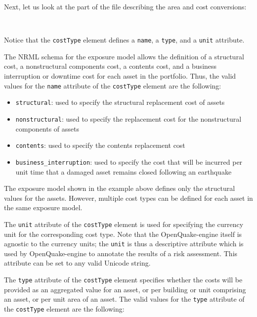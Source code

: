 Next, let us look at the part of the file describing the area and cost
conversions:

\inputminted[firstline=10,firstnumber=10,lastline=15,fontsize=\footnotesize,frame=single,linenos,bgcolor=lightgray]{xml}{oqum/risk/Verbatim/input_exposure_minimal.xml}\\

Notice that the \Verb+costType+ element defines a \Verb+name+, a \Verb+type+, 
and a \Verb+unit+ attribute.

The NRML schema for the exposure model allows the definition of a structural
cost, a nonstructural components cost, a contents cost, and a business
interruption or downtime cost for each asset in the portfolio. Thus, the valid
values for the \Verb+name+ attribute of the \Verb+costType+ element are the
following:

\begin{itemize}

    \item \Verb+structural+: used to specify the structural replacement cost
    of assets

    \item \Verb+nonstructural+: used to specify the replacement cost for the
    nonstructural components of assets

    \item \Verb+contents+: used to specify the contents replacement cost

    \item \Verb+business_interruption+: used to specify the cost that will be 
    incurred per unit time that a damaged asset remains closed following an 
    earthquake

\end{itemize}

The exposure model shown in the example above defines only the structural
values for the assets. However, multiple cost types can be defined for each
asset in the same exposure model.

The \Verb+unit+ attribute of the \Verb+costType+ element is used for
specifying the currency unit for the corresponding cost type. Note that the
OpenQuake-engine itself is agnostic to the currency units; the \Verb+unit+ is
thus a descriptive attribute which is used by OpenQuake-engine to annotate the
results of a risk assessment. This attribute can be set to any valid Unicode
string.

The \Verb+type+ attribute of the \Verb+costType+ element specifies whether the
costs will be provided as an aggregated value for an asset, or per building or
unit comprising an asset, or per unit area of an asset. The valid values for
the \Verb+type+ attribute of the \Verb+costType+ element are the following:


